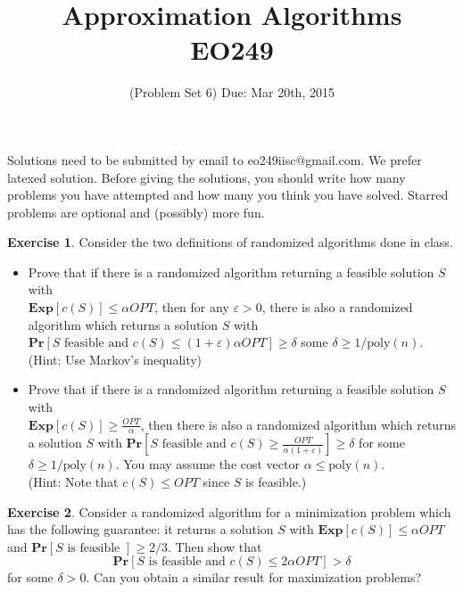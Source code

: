 \documentclass[11pt]{article}
\theoremstyle{definition}
\newtheorem{exercise}{Exercise}
\def\eps{\varepsilon}
\begin{document}
\title{{\bf Approximation Algorithms} \\ 
{\normalsize EO249}}
\date{(Problem Set 6) Due: Mar 20th, 2015}
\maketitle
{\small 
Solutions need to be submitted by email to eo249iisc@gmail.com. We prefer latexed solution. 
Before giving the solutions, you should write how many problems you have attempted and how many you think you have solved.
Starred problems are optional and (possibly) more fun.
}
\vspace{1ex}
\def\poly{\mathrm{poly}}
\def\Exp{\mathbf{Exp}}
\def\Pr{\mathbf{Pr}}

\begin{exercise}
Consider the two definitions of randomized algorithms done in class. 
\begin{itemize}
\item Prove that if there is a randomized algorithm returning a feasible solution $S$ with \\$\Exp[c(S)] \leq \alpha OPT$, then 
for any $\eps> 0$, there is also a randomized algorithm which returns a solution $S$ with $\Pr[S \textrm{ feasible and } c(S) \leq (1+\eps)\alpha OPT ] \geq \delta$
some $\delta \geq 1/\poly(n)$. \\
(Hint: Use Markov's inequality) 
\item  Prove that if there is a randomized algorithm returning a feasible solution $S$ with \\$\Exp[c(S)] \geq \frac{OPT}{\alpha}$, then 
there is also a randomized algorithm which returns a solution $S$ with $\Pr[S \textrm{ feasible and } c(S) \geq \frac{OPT}{\alpha(1+\eps)} ] \geq \delta$
for some $\delta \geq 1/\poly(n)$. You may assume the cost vector $\alpha \leq \poly(n)$.\\
(Hint: Note that $c(S) \leq OPT$ since $S$ is feasible.)
\end{itemize}
\end{exercise}
\vspace{1ex}

\begin{exercise}
Consider a randomized algorithm for a minimization problem which has the following guarantee: it returns a solution $S$ with $\Exp[c(S)] \leq \alpha OPT$ 
and $\Pr[S \textrm{ is feasible }] \geq 2/3$. Then show that 
\[
\Pr[S \textrm{ is feasible and } c(S) \leq 2\alpha OPT] > \delta
\]
for some $\delta> 0$. Can you obtain a similar result for maximization problems?
\end{exercise}
\vspace{1ex}
\end{document}
